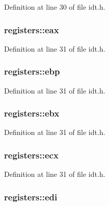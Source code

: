 Definition at line 30 of file idt.h.

\hypertarget{structregisters_ae646012d16da46b9b898a1857a176328}{
\subsubsection[{eax}]{ {\bf registers::eax}}}
\label{structregisters_ae646012d16da46b9b898a1857a176328}


Definition at line 31 of file idt.h.

\hypertarget{structregisters_a35adc6b8d5597dfee367ff90f615c948}{
\subsubsection[{ebp}]{ {\bf registers::ebp}}}
\label{structregisters_a35adc6b8d5597dfee367ff90f615c948}


Definition at line 31 of file idt.h.

\hypertarget{structregisters_a267e7e19e0c7d75c747b6b44d7420896}{
\subsubsection[{ebx}]{ {\bf registers::ebx}}}
\label{structregisters_a267e7e19e0c7d75c747b6b44d7420896}


Definition at line 31 of file idt.h.

\hypertarget{structregisters_a5b930ca144576e0937f838c546d8d015}{
\subsubsection[{ecx}]{ {\bf registers::ecx}}}
\label{structregisters_a5b930ca144576e0937f838c546d8d015}


Definition at line 31 of file idt.h.

\hypertarget{structregisters_a21389bd4fcf274118c6adf12a24c9889}{
\subsubsection[{edi}]{ {\bf registers::edi}}}
\label{structregisters_a21389bd4fcf274118c6adf12a24c9889}



